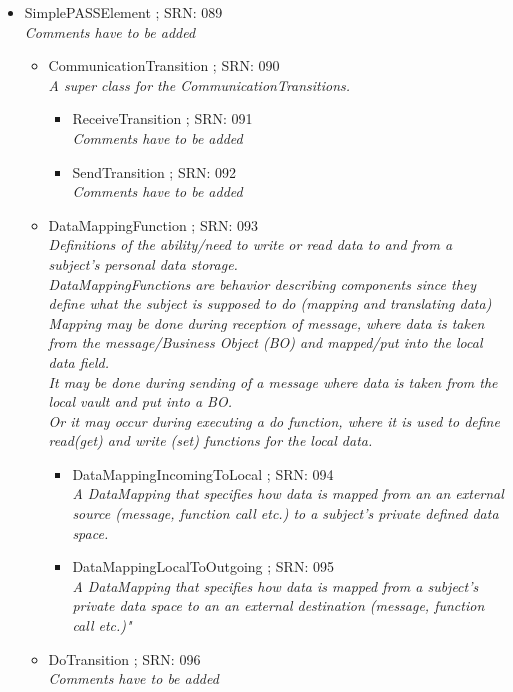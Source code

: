 \begin{itemize}
		\item SimplePASSElement ; SRN: 089 \\ \textit{Comments have to be added}
		\begin{itemize}
			\item CommunicationTransition ; SRN: 090 \\ \textit{A super class for the CommunicationTransitions.}
			\begin{itemize}
				\item ReceiveTransition ; SRN: 091 \\ \textit{Comments have to be added}
				\item SendTransition ; SRN: 092 \\ \textit{Comments have to be added}
			\end{itemize}
			\item DataMappingFunction ; SRN: 093 \\ \textit{Definitions of the ability/need to write or read data to and from a subject's personal data storage.\\
				DataMappingFunctions are behavior describing components since they define what the subject is supposed to do (mapping and translating data)\\
				Mapping may be done during reception of message, where data is taken from the message/Business Object (BO) and mapped/put into the local data field.\\
				It may be done during sending of a message where data is taken from the local vault and put into a BO.\\
				Or it may occur during executing a do function, where it is used to define read(get) and write (set) functions for the local data.}
			\begin{itemize}
				\item DataMappingIncomingToLocal ; SRN: 094 \\ \textit{A DataMapping that specifies how data is mapped from an an external source (message, function call etc.) to a subject's private defined data space.}
				\item DataMappingLocalToOutgoing ; SRN: 095 \\ \textit{A DataMapping that specifies how data is mapped from a subject's private data space to an an external destination (message, function call etc.)" }
			\end{itemize}
			\item DoTransition ; SRN: 096 \\ \textit{Comments have to be added}

\end{itemize}
\end{itemize}
